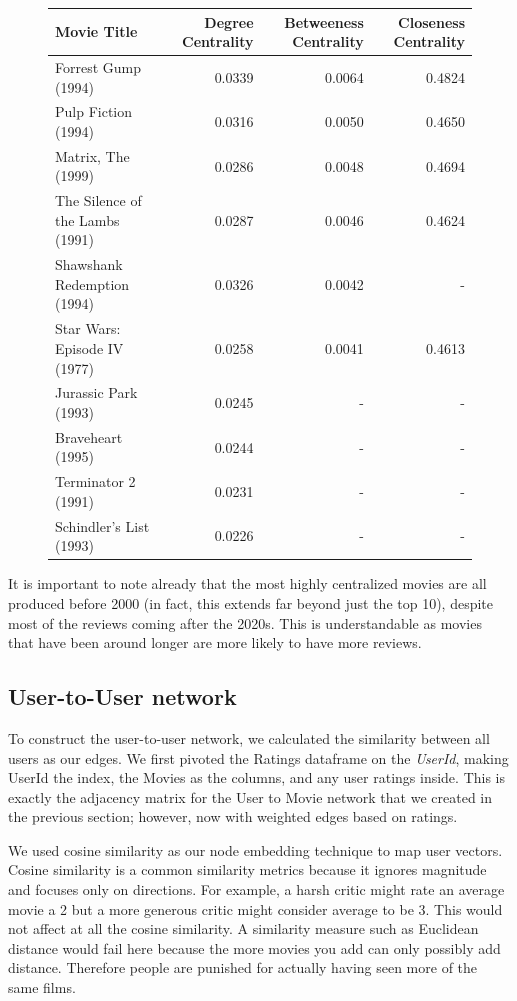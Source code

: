 \documentclass[12pt]{article}
\numberwithin{equation}{section}
\begin{document}
\begin{figure}[h!]
    \begin{tabular}{|p{6cm}|r|r|r|}
        \hline
        \textbf{Movie Title} & \multicolumn{1}{p{2.5cm}|}{\textbf{Degree Centrality}} & \multicolumn{1}{p{3cm}|}{\textbf{Betweeness Centrality}} & \multicolumn{1}{p{3cm}|}{\textbf{Closeness Centrality}} \\
        \hline
        Forrest Gump (1994) & 0.0339 & 0.0064 & 0.4824 \\
        Pulp Fiction (1994) & 0.0316 & 0.0050 & 0.4650 \\
        Matrix, The (1999) & 0.0286 & 0.0048 & 0.4694 \\
        The Silence of the Lambs (1991) & 0.0287 & 0.0046 & 0.4624 \\
        Shawshank Redemption (1994) & 0.0326 & 0.0042 & - \\
        Star Wars: Episode IV (1977) & 0.0258 & 0.0041 & 0.4613 \\
        Jurassic Park (1993) & 0.0245 & - & - \\
        Braveheart (1995) & 0.0244 & - & - \\
        Terminator 2 (1991) & 0.0231 & - & - \\
        Schindler's List (1993) & 0.0226 & - & - \\
        \hline
    \end{tabular}
\label{fig:centrality}
\end{figure}

It is important to note already that the most highly centralized movies are all produced before 2000 (in fact, this extends far beyond just the top 10), despite most of the reviews coming after the 2020s. This is understandable as movies that have been around longer are more likely to have more reviews.

\subsection{User-to-User network}

To construct the user-to-user network, we calculated the similarity between all users as our edges.  We first pivoted the Ratings dataframe on the \textit{UserId},  making UserId the index, the Movies as the columns, and any user ratings inside. This is exactly the adjacency matrix for the User to Movie network that we created in the previous section; however, now with weighted edges based on ratings.

We used cosine similarity as our node embedding technique to map user vectors. Cosine similarity is a common similarity metrics because it ignores magnitude and focuses only on directions. For example, a harsh critic might rate an average movie a 2 but a more generous critic might consider average to be 3. This would not affect at all the cosine similarity. A similarity measure such as Euclidean distance would fail here because the more movies you add can only possibly add distance. Therefore people are punished for actually having seen more of the same films.
\end{document}
